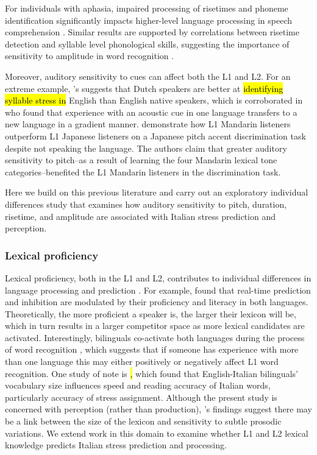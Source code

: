 For individuals with aphasia, impaired processing of risetimes and phoneme identification significantly impacts higher-level language processing in speech comprehension \citep{Kries2023}. Similar results are supported by correlations between risetime detection and syllable level phonological skills, suggesting the importance of sensitivity to amplitude in word recognition \citep{Hamalaine2005}. 

Moreover, auditory sensitivity to cues can affect both the L1 and L2. For an extreme example, \cite{cutler2007dutch}'s suggests that Dutch speakers are better at \hl{identifying syllable stress in} English than English native speakers, which is corroborated in \cite{Pajak2014} who found that experience with an acoustic cue in one language transfers to a new language in a gradient manner. \cite{wienergoss} demonstrate how L1 Mandarin listeners outperform L1 Japanese listeners on a Japanese pitch accent discrimination task despite not speaking the language. The authors claim that greater auditory sensitivity to pitch--as a result of learning the four Mandarin lexical tone categories--benefited the L1 Mandarin listeners in the discrimination task. 

Here we build on this previous literature and carry out an exploratory individual differences study that examines how auditory sensitivity to pitch, duration, risetime, and amplitude are associated with Italian stress prediction and perception.

\subsubsection{Lexical proficiency}
Lexical proficiency, both in the L1 and L2, contributes to individual differences in language processing and prediction \citep{Diependaele2013, Yap2012}. For example, \cite{Kukona2016} found that real-time prediction and inhibition are modulated by their proficiency and literacy in both languages. Theoretically, the more proficient a speaker is, the larger their lexicon will be, which in turn results in a larger competitor space as more lexical candidates are activated. Interestingly, bilinguals co-activate both languages during the process of word recognition \citep{kroll1997lexical, dijkstra2002architecture, marian2003competing}, which suggests that if someone has experience with more than one language this may either positively or negatively affect L1 word recognition. One study of note is \cite{primativo2013bilingual}\hl{,} which found that English-Italian bilinguals' vocabulary size influences speed and reading accuracy of Italian words, particularly accuracy of stress assignment. Although the present study is concerned with perception (rather than production), \cite{primativo2013bilingual}'s findings suggest there may be a link between the size of the lexicon and sensitivity to subtle prosodic variations. We extend work in this domain to examine whether L1 and L2 lexical knowledge predicts Italian stress prediction and processing.

